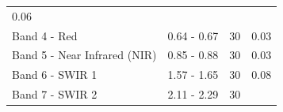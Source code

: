 \documentclass[]{book}
\begin{document}
\begin{longtable}[]{@{}llll@{}}
\begin{minipage}[t]{0.16\columnwidth}
0.06\strut
\end{minipage}\tabularnewline
\begin{minipage}[t]{0.36\columnwidth}\raggedright
Band 4 - Red\strut
\end{minipage} & \begin{minipage}[t]{0.18\columnwidth}\raggedright
0.64 - 0.67\strut
\end{minipage} & \begin{minipage}[t]{0.19\columnwidth}\raggedright
30\strut
\end{minipage} & \begin{minipage}[t]{0.16\columnwidth}\raggedright
0.03\strut
\end{minipage}\tabularnewline
\begin{minipage}[t]{0.36\columnwidth}\raggedright
Band 5 - Near Infrared (NIR)\strut
\end{minipage} & \begin{minipage}[t]{0.18\columnwidth}\raggedright
0.85 - 0.88\strut
\end{minipage} & \begin{minipage}[t]{0.19\columnwidth}\raggedright
30\strut
\end{minipage} & \begin{minipage}[t]{0.16\columnwidth}\raggedright
0.03\strut
\end{minipage}\tabularnewline
\begin{minipage}[t]{0.36\columnwidth}\raggedright
Band 6 - SWIR 1\strut
\end{minipage} & \begin{minipage}[t]{0.18\columnwidth}\raggedright
1.57 - 1.65\strut
\end{minipage} & \begin{minipage}[t]{0.19\columnwidth}\raggedright
30\strut
\end{minipage} & \begin{minipage}[t]{0.16\columnwidth}\raggedright
0.08\strut
\end{minipage}\tabularnewline
\begin{minipage}[t]{0.36\columnwidth}\raggedright
Band 7 - SWIR 2\strut
\end{minipage} & \begin{minipage}[t]{0.18\columnwidth}\raggedright
2.11 - 2.29\strut
\end{minipage} & \begin{minipage}[t]{0.19\columnwidth}\raggedright
30\strut
\end{minipage} & \begin{minipage}[t]{0.16\columnwidth}\raggedright

\end{minipage}
\end{longtable}
\end{document}
